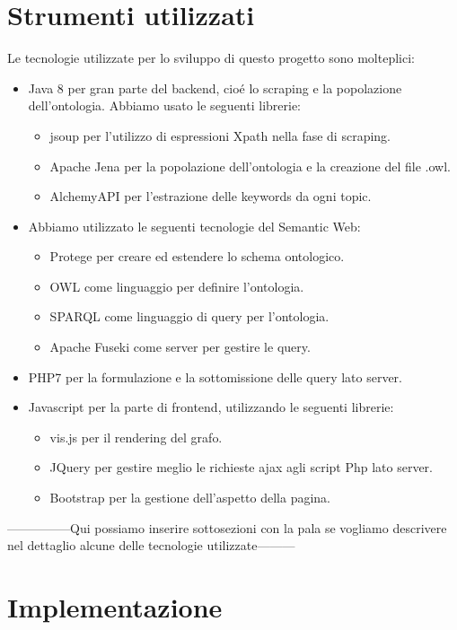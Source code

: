 \documentclass[11pt,twoside,a4paper]{article}
\begin{document}
\section{Strumenti utilizzati}
\label{sec:tools}
Le tecnologie utilizzate per lo sviluppo di questo progetto sono molteplici:
\begin{itemize}
	\item Java 8 per gran parte del backend, cio\'e lo scraping e la popolazione dell'ontologia. Abbiamo usato le seguenti librerie:
	\begin{itemize}
		\item jsoup per l'utilizzo di espressioni Xpath nella fase di scraping.
		\item Apache Jena per la popolazione dell'ontologia e la creazione del file .owl.
		\item AlchemyAPI per l'estrazione delle keywords da ogni topic.
	\end{itemize}
	\item Abbiamo utilizzato le seguenti tecnologie del Semantic Web:
	\begin{itemize}
		\item Protege per creare ed estendere lo schema ontologico.
		\item OWL come linguaggio per definire l'ontologia.
		\item SPARQL come linguaggio di query per l'ontologia.
		\item Apache Fuseki come server per gestire le query.
	\end{itemize}
	\item PHP7 per la formulazione e la sottomissione delle query lato server.
	\item Javascript per la parte di frontend, utilizzando le seguenti librerie:
	\begin{itemize}
		\item vis.js per il rendering del grafo.
		\item JQuery per gestire meglio le richieste ajax agli script Php lato server.
		\item Bootstrap per la gestione dell'aspetto della pagina.
	\end{itemize}
\end{itemize}

---------------Qui possiamo inserire sottosezioni con la pala se vogliamo descrivere nel dettaglio alcune delle tecnologie utilizzate---------

\section{Implementazione}
\label{sec:implementation}
\end{document}
